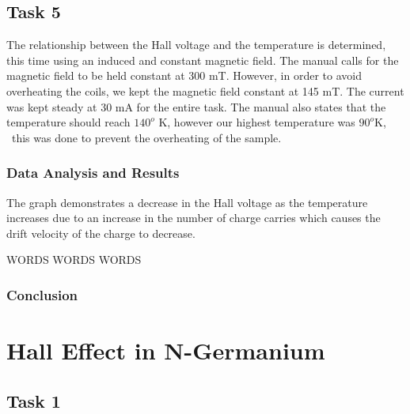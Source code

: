 \documentclass[a4paper]{article}
\begin{document}
\subsection{Task 5}

\qq The relationship between the Hall voltage and the temperature is
determined, this time using an induced and constant magnetic
field. The manual calls for the magnetic field to be held constant at
300 mT. However, in order to avoid overheating the coils, we kept the
magnetic field constant at 145 mT. The current was kept steady at 30
mA for the entire task. The manual also states that the temperature
should reach $140^o$ K, however our highest temperature was $90^o$K, \
this was done to prevent the overheating of the sample.


\subsubsection{Data Analysis and Results}
\qq The graph demonstrates a decrease in the Hall voltage as the
temperature increases due to an increase in the number of charge
carries which causes the drift velocity of the charge to decrease.

\begin{figure}[H]
\centering
\label{task25plot}
\end{figure}

WORDS WORDS WORDS


\subsubsection{Conclusion}

\section{Hall Effect in N-Germanium}

\subsection{Task 1}
\end{document}
